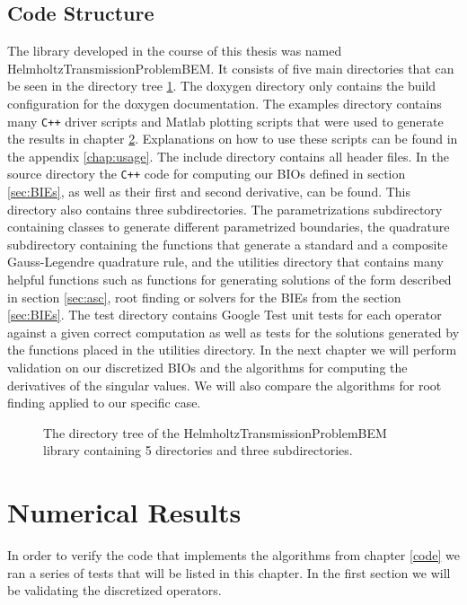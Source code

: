 \documentclass[a4paper, oneside]{discothesis}
\begin{document}
\section{Code Structure}
The library developed in the course of this thesis was named HelmholtzTransmissionProblemBEM.
It consists of five main directories that can be seen in the directory tree \ref{dir:struct}.
The doxygen directory only contains the build configuration for the doxygen documentation.
The examples directory contains many \texttt{C++} driver scripts and Matlab plotting scripts that were used to generate the results in chapter \ref{chap:numres}.
Explanations on how to use these scripts can be found in the appendix \ref{chap:usage}.
The include directory contains all header files.
In the source directory the \texttt{C++} code for computing our BIOs defined in section \ref{sec:BIEs}, as well as their first and second derivative, can be found.
This directory also contains three subdirectories.
The parametrizations subdirectory containing classes to generate different parametrized boundaries, the quadrature subdirectory containing the functions that generate a standard and a composite Gauss-Legendre quadrature rule, and the utilities directory that contains many helpful functions such as functions for generating solutions of the form described in section \ref{sec:asc}, root finding or solvers for the BIEs from the section \ref{sec:BIEs}.
The test directory contains Google Test unit tests for each operator against a given correct computation as well as tests for the solutions generated by the functions placed in the utilities directory.
In the next chapter we will perform validation on our discretized BIOs and the algorithms for computing the derivatives of the singular values.
We will also compare the algorithms for root finding applied to our specific case.
\begin{figure}[H]
	\centering
	\caption{The directory tree of the HelmholtzTransmissionProblemBEM library containing 5 directories and three subdirectories.} 
	\label{dir:struct}
\end{figure}

\chapter{Numerical Results} \label{chap:numres}
In order to verify the code that implements the algorithms from chapter \ref{code} we ran a series of tests that will be listed in this chapter. 
In the first section we will be validating the discretized operators.
\end{document}
